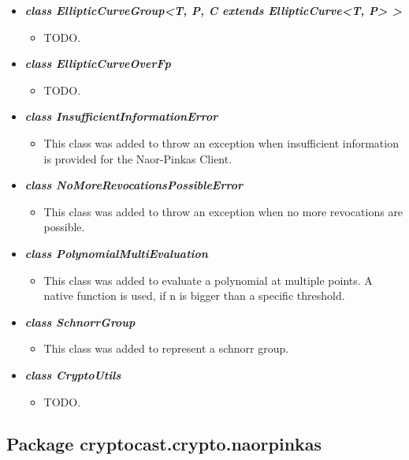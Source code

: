 \documentclass[a4paper,10pt]{scrartcl}
\begin{document}
\begin{itemize}
	\item \textit{\textbf{class EllipticCurveGroup<T, P, C extends EllipticCurve<T, P> >}}
	\begin{itemize}
	 \item TODO.
	\end{itemize}
	
	\item \textit{\textbf{class EllipticCurveOverFp}}
	\begin{itemize}
	 \item TODO.
	\end{itemize}
	
	\item \textit{\textbf{class InsufficientInformationError}}
	\begin{itemize}
	 \item This class was added to throw an exception when insufficient information is provided for the Naor-Pinkas Client.
	\end{itemize}
	
	\item \textit{\textbf{class NoMoreRevocationsPossibleError}}
	\begin{itemize}
	 \item This class was added to throw an exception when no more revocations are possible.
	\end{itemize}
	
	\item \textit{\textbf{class PolynomialMultiEvaluation}}
	\begin{itemize}
	 \item This class was added to evaluate a polynomial at multiple points. A native function is used, 
	 if n is bigger than a specific threshold.
	\end{itemize}
	
	\item \textit{\textbf{class SchnorrGroup}}
	\begin{itemize}
	 \item This class was added to represent a schnorr group.
	\end{itemize}
	
	\item \textbf{\textit{class CryptoUtils}}
	\begin{itemize}
	 \item TODO.
	\end{itemize}
		
\end{itemize}

\subsection{Package cryptocast.crypto.naorpinkas}
\end{document}
